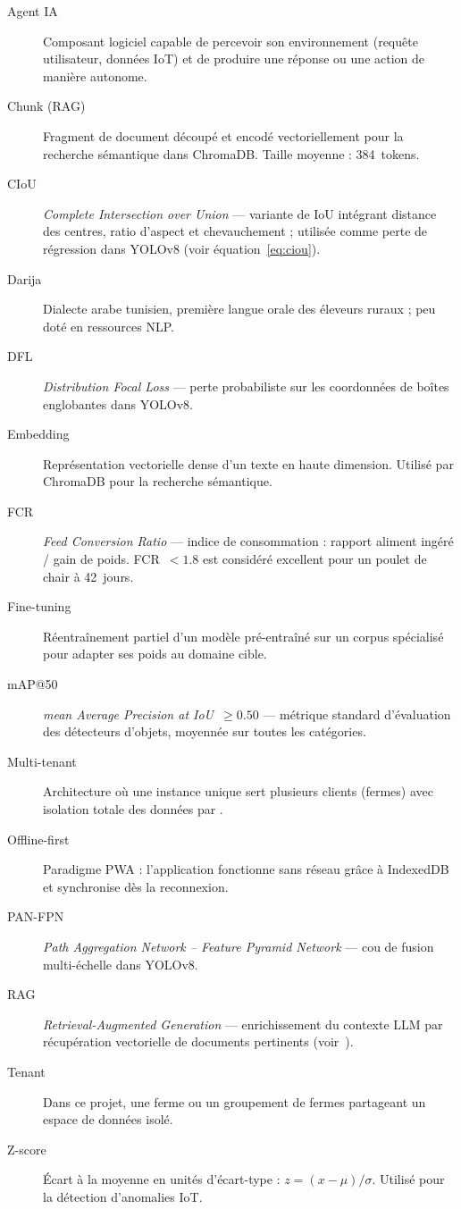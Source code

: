 \begin{description}
  \item[Agent IA] Composant logiciel capable de percevoir son environnement
    (requête utilisateur, données IoT) et de produire une réponse ou une
    action de manière autonome.
  \item[Chunk (RAG)] Fragment de document découpé et encodé vectoriellement
    pour la recherche sémantique dans ChromaDB. Taille moyenne : 384~tokens.
  \item[CIoU] \textit{Complete Intersection over Union} — variante de IoU
    intégrant distance des centres, ratio d'aspect et chevauchement ;
    utilisée comme perte de régression dans YOLOv8 (voir équation~\ref{eq:ciou}).
  \item[Darija] Dialecte arabe tunisien, première langue orale des éleveurs
    ruraux ; peu doté en ressources NLP.
  \item[DFL] \textit{Distribution Focal Loss} — perte probabiliste sur les
    coordonnées de boîtes englobantes dans YOLOv8.
  \item[Embedding] Représentation vectorielle dense d'un texte en haute
    dimension. Utilisé par ChromaDB pour la recherche sémantique.
  \item[FCR] \textit{Feed Conversion Ratio} — indice de consommation :
    rapport aliment ingéré / gain de poids. FCR~$< 1.8$ est considéré
    excellent pour un poulet de chair à 42~jours.
  \item[Fine-tuning] Réentraînement partiel d'un modèle pré-entraîné sur
    un corpus spécialisé pour adapter ses poids au domaine cible.
  \item[mAP@50] \textit{mean Average Precision at IoU~$\geq 0.50$} —
    métrique standard d'évaluation des détecteurs d'objets, moyennée sur
    toutes les catégories.
  \item[Multi-tenant] Architecture où une instance unique sert plusieurs
    clients (fermes) avec isolation totale des données par .
  \item[Offline-first] Paradigme PWA : l'application fonctionne sans
    réseau grâce à IndexedDB et synchronise dès la reconnexion.
  \item[PAN-FPN] \textit{Path Aggregation Network -- Feature Pyramid
    Network} — cou de fusion multi-échelle dans YOLOv8.
  \item[RAG] \textit{Retrieval-Augmented Generation} — enrichissement du
    contexte LLM par récupération vectorielle de documents pertinents
    (voir~\cite{lewis2020rag}).
  \item[Tenant] Dans ce projet, une ferme ou un groupement de fermes
    partageant un espace de données isolé.
  \item[Z-score] Écart à la moyenne en unités d'écart-type :
    $z = (x-\mu)/\sigma$. Utilisé pour la détection d'anomalies IoT.
\end{description}


